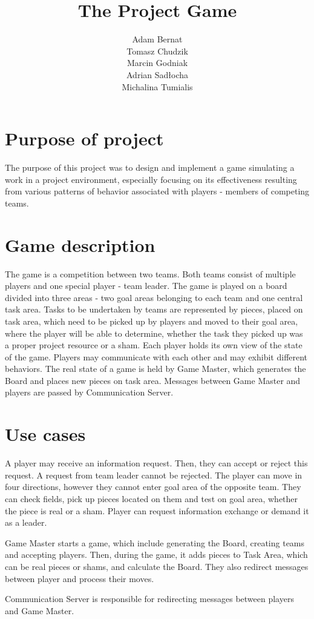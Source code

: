 \documentclass[a4paper]{article}
\title{The Project Game}
\author{
Adam Bernat \\
Tomasz Chudzik \\
Marcin Godniak \\
Adrian Sadłocha \\
Michalina Tumialis
}
\begin{document}
\maketitle
\newpage
\section{Purpose of project}

The purpose of this project was to design and implement a game simulating a work in a project environment, especially focusing on its effectiveness resulting from various patterns of behavior associated with players - members of competing teams.

\section{Game description}

The game is a competition between two teams. Both teams consist of multiple players and one special player - team leader.
The game is played on a board divided into three areas - two goal areas belonging to each team and one central task area.
Tasks to be undertaken by teams are represented by pieces, placed on task area, which need to be picked up by players and moved to their goal area, where the player will be able to determine, whether the task they picked up was a proper project resource or a sham. 
Each player holds its own view of the state of the game. 
Players may communicate with each other and may exhibit different behaviors. 
The real state of a game is held by Game Master, which generates the Board and places new pieces on task area. 
Messages between Game Master and players are passed by Communication Server.
\newpage
\section{Use cases}

A player may receive an information request. Then, they can accept or reject this request. A request from team leader cannot be rejected. The player can move in four directions, however they cannot enter goal area of the opposite team. They can check fields, pick up pieces located on them and test on goal area, whether the piece is real or a sham.  Player can request information exchange or demand it as a leader.

Game Master starts a game, which include generating the Board, creating teams and accepting players. Then, during the game, it adds pieces to Task Area, which can be real pieces or shams, and calculate the Board. They also redirect messages between player and process their moves.

Communication Server is responsible for redirecting messages between players and Game Master.
\newline
\end{document}
